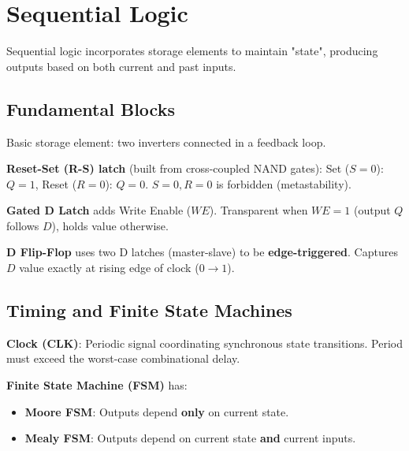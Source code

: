 \section{Sequential Logic}

\begin{definition}
Sequential logic incorporates storage elements to maintain "state", producing outputs based on both current and past inputs.
\end{definition}

\subsection{Fundamental Blocks}

\begin{definition}
Basic storage element: two inverters connected in a feedback loop.
\end{definition}

\begin{definition}
\textbf{Reset-Set (R-S) latch} (built from cross-coupled NAND gates):
Set ($S=0$): $Q=1$, Reset ($R=0$): $Q=0$.
$S=0, R=0$ is forbidden (metastability).
\end{definition}

\begin{definition}
\textbf{Gated D Latch} adds Write Enable ($WE$). Transparent when $WE=1$ (output $Q$ follows $D$), holds value otherwise.
\end{definition}

\begin{definition}
\textbf{D Flip-Flop} uses two D latches (master-slave) to be \textbf{edge-triggered}. Captures $D$ value exactly at rising edge of clock ($0 \to 1$).
\end{definition}

\subsection{Timing and Finite State Machines}

\begin{definition}
\textbf{Clock (CLK)}: Periodic signal coordinating synchronous state transitions. Period must exceed the worst-case combinational delay.
\end{definition}

\begin{definition}
\textbf{Finite State Machine (FSM)} has:
\begin{itemize}
    \item \textbf{Moore FSM}: Outputs depend \textbf{only} on current state.
    \item \textbf{Mealy FSM}: Outputs depend on current state \textbf{and} current inputs.
\end{itemize}
\end{definition}

